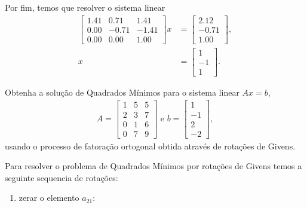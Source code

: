 \documentclass[a4paper,12pt, leqno, answers]{exam}
\begin{document}
\begin{questions}
\begin{solution}
        Por fim, temos que resolver o sistema linear
        \begin{align*}
            \begin{bmatrix}
                1.41 & 0.71 & 1.41 \\
                0.00 & -0.71 & -1.41 \\
                0.00 & 0.00 & 1.00
            \end{bmatrix} x &= \begin{bmatrix}
                2.12 \\
                -0.71 \\
                1.00
            \end{bmatrix}, \\
            x &= \begin{bmatrix}
                1 \\
                -1 \\
                1
            \end{bmatrix}.
        \end{align*}
    \end{solution}

    \question Obtenha a solu\c{c}\~{a}o de Quadrados M\'{i}nimos para o sistema linear $A x = b$,
    \begin{align*}
        A = \begin{bmatrix}
            1 & 5 & 5 \\
            2 & 3 & 7 \\
            0 & 1 & 6 \\
            0 & 7 & 9
        \end{bmatrix} \text{ e } b = \begin{bmatrix}
            1 \\
            -1 \\
            2 \\
            -2
        \end{bmatrix},
    \end{align*}
    usando o processo de fatora\c{c}\~{a}o ortogonal obtida atrav\'{e}s de rota\c{c}\~{o}es de Givens.
    \begin{solution}
        Para resolver o problema de Quadrados M\'{i}nimos por rota\c{c}\~{o}es de Givens temos a seguinte sequencia de rota\c{c}\~{o}es:
        \begin{enumerate}
            \item zerar o elemento $a_{21}$:


\end{enumerate}
\end{solution}
\end{questions}
\end{document}
